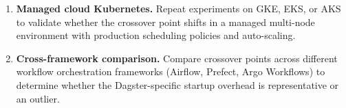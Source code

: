 \begin{enumerate}
  \item \textbf{Managed cloud Kubernetes.}
  Repeat experiments on GKE, EKS, or AKS to validate whether the crossover point shifts in a managed multi-node environment with production scheduling policies and auto-scaling.

  \item \textbf{Cross-framework comparison.}
  Compare crossover points across different workflow orchestration frameworks (Airflow, Prefect, Argo Workflows) to determine whether the Dagster-specific startup overhead is representative or an outlier.
\end{enumerate}
